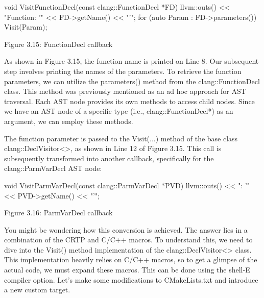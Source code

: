 \begin{cpp}
void VisitFunctionDecl(const clang::FunctionDecl *FD) {
  llvm::outs() << "Function: ’" << FD->getName() << "’\n";
  for (auto Param : FD->parameters()) {
    Visit(Param);
  }
}
\end{cpp}

\begin{center}
Figure 3.15: FunctionDecl callback
\end{center}

As shown in Figure 3.15, the function name is printed on Line 8. Our subsequent step involves printing the names of the parameters. To retrieve the function parameters, we can utilize the parameters() method from the clang::FunctionDecl class. This method was previously mentioned as an ad hoc approach for AST traversal. Each AST node provides its own methods to access child nodes. Since we have an AST node of a specific type (i.e., clang::FunctionDecl*) as an argument, we can employ these methods.

The function parameter is passed to the Visit(...) method of the base class clang::DeclVisitor<>, as shown in Line 12 of Figure 3.15. This call is subsequently transformed into another callback, specifically for the clang::ParmVarDecl AST node:

\begin{cpp}
void VisitParmVarDecl(const clang::ParmVarDecl *PVD) {
  llvm::outs() << "\tParameter: ’" << PVD->getName() << "’\n";
}
\end{cpp}

\begin{center}
Figure 3.16: ParmVarDecl callback
\end{center}

You might be wondering how this conversion is achieved. The answer lies in a combination of the CRTP and C/C++ macros. To understand this, we need to dive into the Visit() method implementation of the clang::DeclVisitor<> class. This implementation heavily relies on C/C++ macros, so to get a glimpse of the actual code, we must expand these macros. This can be done using the shell-E compiler option. Let’s make some modifications to CMakeLists.txt and introduce a new custom target.


